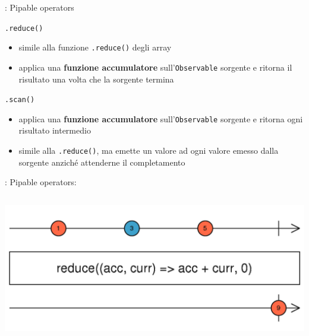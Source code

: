             \begin{frame}{\insertsubsectionhead}{: Pipable operators}
                \begin{block}{\texttt{.reduce()}}
                    \begin{itemize}
                        \item
                            simile alla funzione \texttt{.reduce()} degli array
                        \item
                            applica una \textbf{funzione accumulatore} sull'\texttt{Observable} sorgente e ritorna il risultato una volta che la sorgente termina
                    \end{itemize}
                \end{block}

                \begin{block}{\texttt{.scan()}}
                    \begin{itemize}
                        \item
                            applica una \textbf{funzione accumulatore} sull'\texttt{Observable} sorgente e ritorna ogni risultato intermedio
                        \item
                            simile alla \texttt{.reduce()}, ma emette un valore ad ogni valore emesso dalla sorgente anziché attenderne il completamento
                    \end{itemize}
                \end{block}

            \end{frame}

            \begin{frame}[fragile]{\insertsubsectionhead}{: Pipable operators: \texttt{\insertsubsubsectionhead}}
                \inputminted{js}{src/reduce.js}
                \includegraphics[width=\linewidth]{reduce}
            \end{frame}

